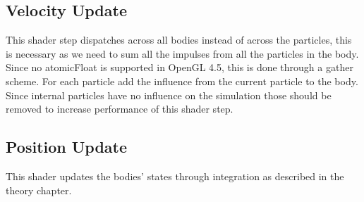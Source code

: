 \subsection{Velocity Update}
This shader step dispatches across all bodies instead of across the particles, this
is necessary as we need to sum all the impulses from all the particles in the body.
Since no atomicFloat is supported in OpenGL 4.5, this is done through a gather scheme.
For each particle add the influence from the current particle to the body.
Since internal particles have no influence on the simulation
those should be removed to increase performance of this shader step.

\subsection{Position Update}
This shader updates the bodies' states through integration as described in the theory chapter.
